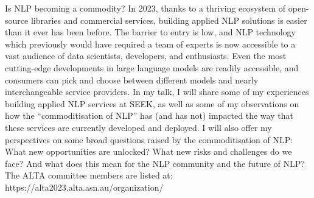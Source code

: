 Is NLP becoming a commodity? In 2023, thanks to a thriving ecosystem of open-source libraries and commercial services, building applied NLP solutions is easier than it ever has been before. The barrier to entry is low, and NLP technology which previously would have required a team of experts is now accessible to a vast audience of data scientists, developers, and enthusiasts. Even the most cutting-edge developments in large language models are readily accessible, and consumers can pick and choose between different models and nearly interchangeable service providers. In my talk, I will share some of my experiences building applied NLP services at SEEK, as well as some of my observations on how the “commoditisation of NLP” has (and has not) impacted the way that these services are currently developed and deployed. I will also offer my perspectives on some broad questions raised by the commoditisation of NLP: What new opportunities are unlocked? What new risks and challenges do we face? And what does this mean for the NLP community and the future of NLP?
The ALTA committee members are listed at:
https://alta2023.alta.asn.au/organization/
